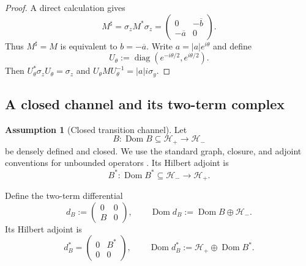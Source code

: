\documentclass[11pt,reqno]{scrartcl}
\newcommand{\scrHp}{\mathscr H_{+}}
\newcommand{\scrHm}{\mathscr H_{-}}
\DeclareMathOperator{\Dom}{Dom}
\DeclareMathOperator{\diag}{diag}
\theoremstyle{plain}
\theoremstyle{definition}
\newtheorem{assumption}[assumption]{Assumption}
\theoremstyle{remark}
\begin{document}
\begin{proof}
A direct calculation gives
\begin{equation}
  M^\sharp
  =\sigma_zM^*\sigma_z
  =
  \begin{pmatrix}
    0&-\overline b\\
    -\overline a&0
  \end{pmatrix}.
\end{equation}
Thus \(M^\sharp=M\) is equivalent to \(b=-\overline a\). Write
\(a=|a|e^{i\theta}\) and define
\begin{equation}
  U_\theta:=\diag(e^{-i\theta/2},e^{i\theta/2}).
\end{equation}
Then \(U_\theta^*\sigma_zU_\theta=\sigma_z\) and
\(U_\theta M U_\theta^{-1}=|a|i\sigma_y\).
\end{proof}

\subsection{A closed channel and its two-term complex}

\begin{assumption}[Closed transition channel]
\label{ass:B}
Let
\begin{equation}
  B:\Dom B\subseteq\scrHp\longrightarrow\scrHm
  \label{eq:B}
\end{equation}
be densely defined and closed. We use the standard graph, closure, and adjoint
conventions for unbounded operators \cite{Kato,ReedSimon}. Its Hilbert adjoint is
\begin{equation}
  B^*:\Dom B^*\subseteq\scrHm\longrightarrow\scrHp.
\end{equation}
\end{assumption}

Define the two-term differential
\begin{equation}
  d_B:=
  \begin{pmatrix}
    0&0\\
    B&0
  \end{pmatrix},
  \qquad
  \Dom d_B:=\Dom B\oplus\scrHm.
  \label{eq:dB}
\end{equation}
Its Hilbert adjoint is
\begin{equation}
  d_B^*=
  \begin{pmatrix}
    0&B^*\\
    0&0
  \end{pmatrix},
  \qquad
  \Dom d_B^*:=\scrHp\oplus\Dom B^*.
  \label{eq:dBstar}
\end{equation}
\end{document}
